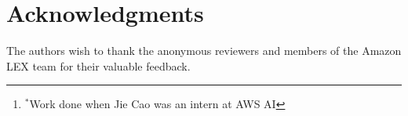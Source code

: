 \documentclass[11pt,a4paper]{article}
\title{\mytitle}
\author{
  Jie Cao${^\dagger}$\thanks{${^\ast}$Work done when Jie Cao was an intern at AWS AI},
  Yi Zhang${^\ddagger}$,
  Adel Youssef${^\ddagger}$,
  Vivek Srikumar${^\dagger}$ \\
  ${^\dagger}$School of Computing, University of Utah\\
  ${^\ddagger}$AWS AI, Amazon\\
  {\tt \{jcao, svivek\}@cs.utah.edu,}
  {\tt \{yizhngn, adel\}@amazon.com}\\
 }
\date{}
\begin{document}
\maketitle
\begin{abstract}
  This paper describes the system submission of our team {\it Amazon}
  to the shared task on Cross Framework Meaning Representation
  Parsing~(MRP) at the 2019 Conference for Computational Language
  Learning~(CoNLL). Via extensive analysis of implicit alignments in
  AMR, we recategorize five meaning representations~(MRs) into two
  classes: Lexical-Anchoring and Phrasal-Anchoring. Then we propose a
  unified graph-based parsing framework for the lexical-anchoring MRs,
  and a phrase-structure parsing for one of the phrasal-anchoring MRs,
  UCCA. Our system submission ranked 1st in the AMR subtask, and later
  improvements shows promising results on other frameworks as well.
\end{abstract}









%



\section*{Acknowledgments}
The authors wish to thank the anonymous reviewers and members of the
Amazon LEX team for their valuable feedback.





%
\end{document}
